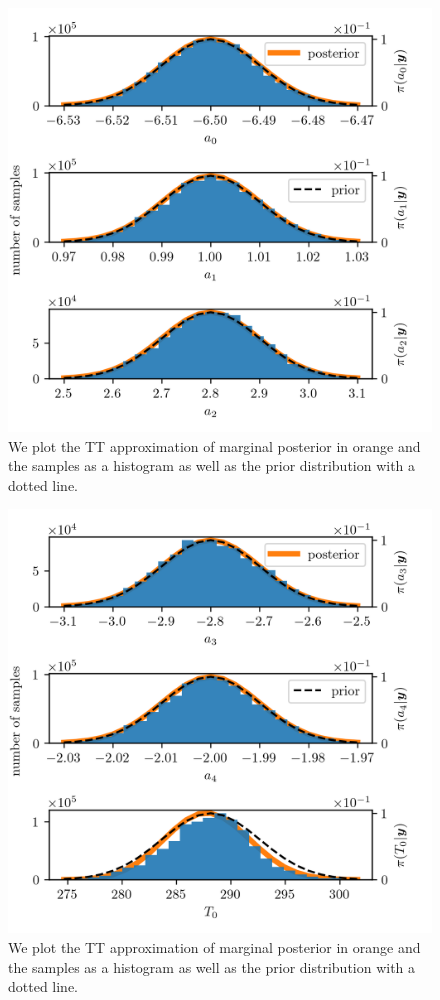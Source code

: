 \begin{figure}[ht!]
	\centering
	\includegraphics{PHdPTPost2.png}
	\caption[Histograms and TT approximation of posterior distribution as well as hyper-prior distribution.]{We plot the TT approximation of marginal posterior in orange and the samples as a histogram as well as the prior distribution with a dotted line.}
	\label{fig:PostHistTT2}
\end{figure}
\begin{figure}[ht!]
	\centering
	\includegraphics{PHdPTPost3.png}
	\caption[Histograms and TT approximation of posterior distribution as well as hyper-prior distribution.]{We plot the TT approximation of marginal posterior in orange and the samples as a histogram as well as the prior distribution with a dotted line.}
	\label{fig:PostHistTT3}
\end{figure}
